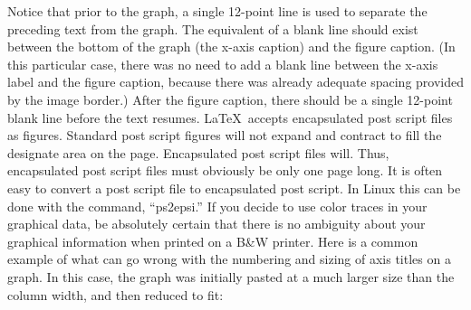 \documentclass[conference]{IEEEtran}
\begin{document}
{Notice that prior to the graph, a single 12-point line is used to
separate the preceding text from the graph. The equivalent of a blank
line should exist between the bottom of the graph (the x-axis caption)
and the figure caption. (In this particular case, there was no need to
add a blank line between the x-axis label and the figure caption,
because there was already adequate spacing provided by the image
border.) After the figure caption, there should be a single 12-point
blank line before the text resumes. \LaTeX\ accepts encapsulated
post script files as figures.  Standard post script figures will not
expand and contract to fill the designate area on the page.
Encapsulated post script files will.  Thus, encapsulated post script
files must obviously be only one page long.  It is often easy to convert a post
script file to encapsulated post script.  In Linux this can be done
with the command, ``ps2epsi.''
If you decide to use color traces in your graphical data, be absolutely certain that there is no ambiguity about your graphical information when printed on a B\&W printer.
Here is a common example of what can go wrong with the numbering and sizing of axis titles on a graph. In this case, the graph was initially pasted at a much larger size than the column width, and then reduced to fit:

}
\end{document}
